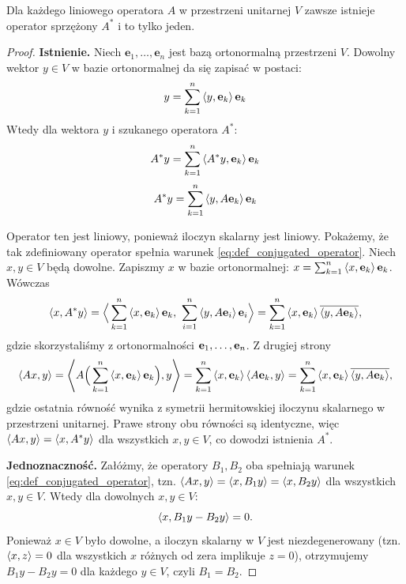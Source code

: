 \begin{theorem}\label{theorem:existing_of_conjugated_operator}
Dla każdego liniowego operatora $A$ w przestrzeni unitarnej $V$ zawsze istnieje operator sprzężony $A^*$ i to tylko jeden.
\end{theorem}
\begin{proof}
\textbf{Istnienie.} Niech $\mathbf{e}_1, \ldots, \mathbf{e}_n$ jest bazą ortonormalną przestrzeni $V$. Dowolny wektor $y \in V$ w bazie ortonormalnej da się zapisać w postaci:
$$ y = \sum_{k=1}^{n}{\left\langle y, \mathbf{e}_k \right\rangle\mathbf{e}_k} $$
    Wtedy dla wektora $y$ i szukanego operatora $A^*$:
\begin{equation}
        A^*y = \sum_{k=1}^{n}{\left\langle A^*y, \mathbf{e}_k \right\rangle\mathbf{e}_k}
\end{equation}
\begin{equation}
        A^*y = \sum_{k=1}^{n}{\left\langle y, A\mathbf{e}_k \right\rangle\mathbf{e}_k}
\end{equation}

Operator ten jest liniowy, ponieważ iloczyn skalarny jest liniowy.
Pokażemy, że tak zdefiniowany operator spełnia warunek \eqref{eq:def_conjugated_operator}. Niech $x, y \in V$ będą dowolne. Zapiszmy $x$ w bazie ortonormalnej: $x = \sum_{k=1}^n \left\langle x, \mathbf{e}_k \right\rangle\mathbf{e}_k$. Wówczas
\begin{equation}
    \left\langle x, A^*y \right\rangle = \Big\langle \sum_{k=1}^n \left\langle x, \mathbf{e}_k \right\rangle\mathbf{e}_k,\ \sum_{i=1}^n \left\langle y, A\mathbf{e}_i \right\rangle\mathbf{e}_i \Big\rangle = \sum_{k=1}^n \left\langle x, \mathbf{e}_k \right\rangle\overline{\left\langle y, A\mathbf{e}_k \right\rangle},
\end{equation}
gdzie skorzystaliśmy z ortonormalności $\mathbf{e}_1, \ldots, \mathbf{e}_n$. 
Z drugiej strony
\begin{equation}
    \left\langle Ax, y \right\rangle = \left\langle 
        A\Big(\sum_{k=1}^n \left\langle x, \mathbf{e}_k \right\rangle\mathbf{e}_k\Big)
    , y \right\rangle = \sum_{k=1}^n \left\langle x, \mathbf{e}_k \right\rangle\left\langle A\mathbf{e}_k, y \right\rangle = \sum_{k=1}^n \left\langle x, \mathbf{e}_k \right\rangle\overline{\left\langle y, A\mathbf{e}_k \right\rangle},
\end{equation}
gdzie ostatnia równość wynika z symetrii hermitowskiej iloczynu skalarnego w przestrzeni unitarnej.
Prawe strony obu równości są identyczne, więc $\left\langle Ax, y \right\rangle = \left\langle x, A^*y \right\rangle$ dla wszystkich $x,y \in V$, co dowodzi istnienia $A^*$.

\textbf{Jednoznaczność.} Załóżmy, że operatory $B_1, B_2$ oba spełniają warunek \eqref{eq:def_conjugated_operator}, tzn. $\left\langle Ax, y \right\rangle = \left\langle x, B_1y \right\rangle = \left\langle x, B_2y \right\rangle$ dla wszystkich $x,y \in V$. Wtedy dla dowolnych $x, y \in V$:
\begin{equation}
    \left\langle x, B_1y - B_2y \right\rangle = 0.
\end{equation}
Ponieważ $x \in V$ było dowolne, a iloczyn skalarny w $V$ jest niezdegenerowany (tzn. $\left\langle x, z \right\rangle=0$ dla wszystkich $x$ różnych od zera implikuje $z=0$), otrzymujemy $B_1y - B_2y = 0$ dla każdego $y \in V$, czyli $B_1 = B_2$.
\end{proof}

